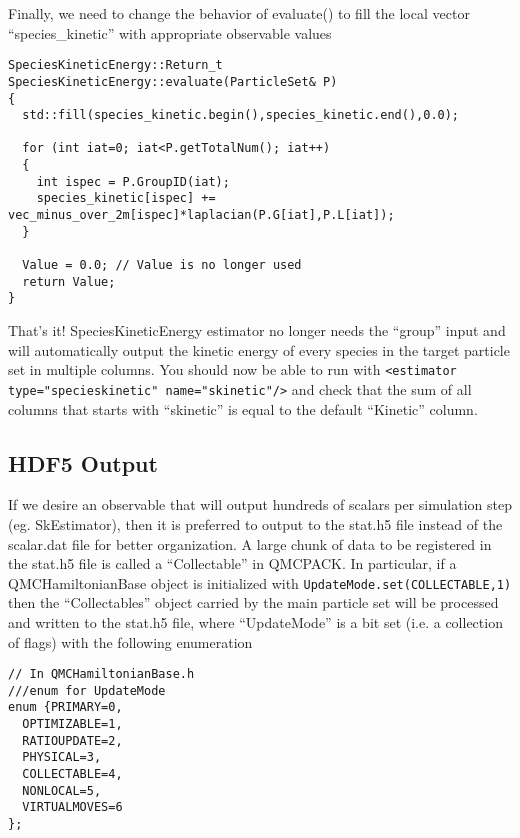 \documentclass[aps,prl,preprint]{revtex4-1}
\begin{document}
Finally, we need to change the behavior of evaluate() to fill the local vector ``species\_kinetic'' with appropriate observable values
\begin{lstlisting}
SpeciesKineticEnergy::Return_t SpeciesKineticEnergy::evaluate(ParticleSet& P)
{
  std::fill(species_kinetic.begin(),species_kinetic.end(),0.0);

  for (int iat=0; iat<P.getTotalNum(); iat++)
  {
    int ispec = P.GroupID(iat);
    species_kinetic[ispec] += vec_minus_over_2m[ispec]*laplacian(P.G[iat],P.L[iat]);
  }
  
  Value = 0.0; // Value is no longer used
  return Value;
}
\end{lstlisting}
That's it! SpeciesKineticEnergy estimator no longer needs the ``group'' input and will automatically output the kinetic energy of every species in the target particle set in multiple columns. You should now be able to run with 
\verb|<estimator type="specieskinetic" name="skinetic"/>| and check that the sum of all columns that starts with ``skinetic'' is equal to the default ``Kinetic'' column.

\subsection{HDF5 Output}
If we desire an observable that will output hundreds of scalars per simulation step (eg. SkEstimator), then it is preferred to output to the stat.h5 file instead of the scalar.dat file for better organization. A large chunk of data to be registered in the stat.h5 file is called a ``Collectable'' in QMCPACK. In particular, if a QMCHamiltonianBase object is initialized with \verb|UpdateMode.set(COLLECTABLE,1)| then the ``Collectables'' object carried by the main particle set will be processed and written to the stat.h5 file, where ``UpdateMode'' is a bit set (i.e. a collection of flags) with the following enumeration
\begin{lstlisting}
// In QMCHamiltonianBase.h
///enum for UpdateMode
enum {PRIMARY=0,
  OPTIMIZABLE=1,
  RATIOUPDATE=2,
  PHYSICAL=3,
  COLLECTABLE=4,
  NONLOCAL=5,
  VIRTUALMOVES=6
};
\end{lstlisting}
\end{document}
